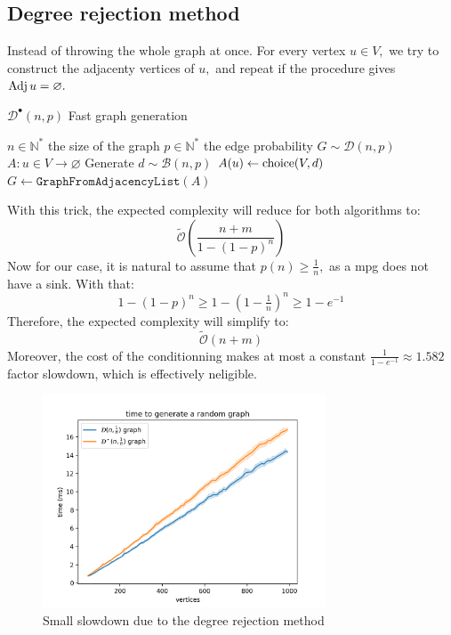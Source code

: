 \subsection{Degree rejection method}
\label{section:Dataset:Sinkless:DegreeRejection}
Instead of throwing the whole graph at once. For every vertex $u\in V,$ we try to construct the adjacenty vertices of $u,$ and repeat if the procedure gives $\operatorname{Adj} u =\varnothing.$
\begin{algorithm}[ht]
	\caption{$\mathcal{D}^\bullet(n,p)$ Fast graph generation}\label{alg:Dnp_Sinkless_Fast}
	\begin{algorithmic}
		\Require $n\in\mathbb{N}^*$ the size of the graph
		\Require $p\in\mathbb{N}^*$ the edge probability 
		\Ensure $G\sim \mathcal{D}(n,p)$  
		\State $A:u\in V\rightarrow \varnothing$
		\Repeat
			\State Generate $d\sim \mathcal{B}(n,p)$		
		\State $A(u)\leftarrow \operatorname{choice}(V,d)$
		\EndFor
		\State \Return $G\leftarrow \texttt{GraphFromAdjacencyList}(A)$
	\end{algorithmic}
\end{algorithm} 
\FloatBarrier

With this trick, the expected complexity will reduce for both algorithms to:
$$
\tilde{\mathcal{O}}\left(\frac{n+m}{1-(1-p)^n}\right)
$$
Now for our case, it is natural to assume that $p(n) \ge \frac{1}{n},$ as a \acrshort{mpg} does not have a sink. With that: 
\begin{equation*}
	1-(1-p)^n \ge 1-(1-\tfrac{1}{n})^n \ge 1-e^{-1}
\end{equation*}
Therefore, the expected complexity will simplify to:
\begin{equation*}
	\tilde{\mathcal{O}}\left(n+m\right)
\end{equation*}
Moreover, the cost of the conditionning makes at most a constant $\frac{1}{1-e^{-1}}\approx 1.582$ factor slowdown, which is effectively neligible.

\begin{figure}[H]
	\centering
	\includegraphics[width=0.75\textwidth]{Figures/DegreeSparseGraphGen.png}
	\caption{Small slowdown due to the degree rejection method}
\end{figure}
\FloatBarrier

